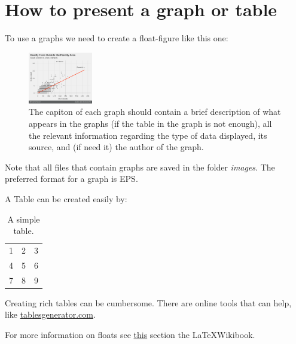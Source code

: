 \documentclass[11pt,a4paper,oneside]{book}
\newcommand{\latex}{\LaTeX{}} %
\begin{document}
\section{How to present a graph or table}
\label{sec:floats}
To use a graphs we need to create a float-figure like this one:
\begin{figure}[h!]
  \centering
    \includegraphics[width=0.25\textwidth]{example}
    \caption{The capiton of each graph should contain a brief description of what appears in the graphs (if the table in the graph is not enough), all the relevant information regarding the type of data displayed, its source, and (if need it) the author of the graph.}
    \label{fig:messi_vs_ronaldo}
\end{figure}

Note that all files that contain graphs are saved in the folder \textit{images}. The preferred format for a graph is EPS.

A Table can be created easily by:
\begin{table}[h!]
  \centering
    \begin{tabular}{| l c r |}
    \hline
    1 & 2 & 3 \\
    4 & 5 & 6 \\
    7 & 8 & 9 \\
    \hline
    \end{tabular}
  \caption{A simple table.}
  \label{tab:simple_table}
\end{table}

Creating rich tables can be cumbersome. There are online tools that can help, like \href{https://www.tablesgenerator.com/}{tablesgenerator.com}.

For more information on floats see \href{https://en.wikibooks.org/wiki/LaTeX/Floats,_Figures_and_Captions}{this} section the \latex Wikibook.

\end{document}
